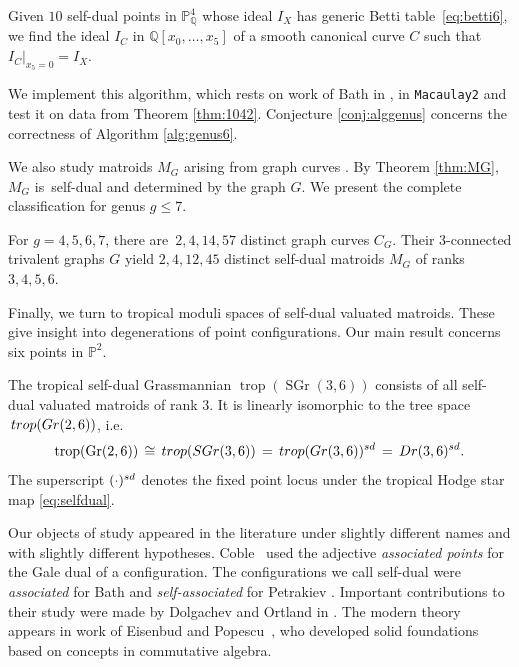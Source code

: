\documentclass[12pt]{extarticle}
\theoremstyle{definition}
\numberwithin{theorem}{section}
\theoremstyle{plain}\newtheorem{ithm}{Theorem}
\newcommand{\PP}{\mathbb{P}}
\newcommand{\QQ}{\mathbb{Q}}
\DeclareMathOperator{\trop}{trop}
\DeclareMathOperator{\SGr}{SGr}
\DeclareMathOperator{\Gr}{Gr}
\newenvironment{customthm}[1]
{\renewcommand\theinnercustomthm{#1}\innercustomthm}
{\endinnercustomthm}
\newenvironment{customalg}[1]
{\renewcommand\theinnercustomalg{#1}\innercustomalg}
{\endinnercustomalg}
\begin{document}
\begin{customalg}{\ref{alg:genus6}}
Given $10$ self-dual points in $\PP^4_\QQ$ whose ideal $I_X$ has 
generic 
Betti table~\eqref{eq:betti6},
we 
find the ideal $I_C$ in $\QQ[x_0,\ldots,x_5]$ of a 
smooth canonical curve $C$ such that $I_C|_{x_5 = 0}=I_X$. 
\end{customalg}

We implement this algorithm, which rests on work of Bath in \cite{Bath},
in  \texttt{Macaulay2} \cite{M2} and test it on data from Theorem \ref{thm:1042}.
Conjecture \ref{conj:alggenus} concerns the correctness of 
Algorithm \ref{alg:genus6}.

We also study matroids $M_G$ arising from graph curves  \cite{BE}.
By Theorem \ref{thm:MG}, $M_G$ is~self-dual and determined by the graph $G$.
We present the complete classification for genus $g \leq 7$.

\begin{customthm} {\ref{thm:graphcurves4567}}
  For $g=4,5,6,7$, there are  $\,2,4,14,57$ distinct graph curves $C_G$.
  Their $3$-connected trivalent graphs $G$ yield $2,4,12,45$ distinct self-dual matroids $M_G$ of
  ranks $3,4,5,6$.
\end{customthm}

Finally, we turn to tropical moduli spaces of  self-dual valuated matroids. These give insight into degenerations of point configurations. Our main result concerns six points in $\PP^2$.

  \begin{customthm}{\ref{thm:dreisechs}}
  The tropical self-dual Grassmannian $\trop(\SGr(3,6))$ consists of all self-dual valuated matroids 
  of rank $3$.
   It is linearly isomorphic to the tree space $\,{\rm trop}({\rm Gr}(2,6))$, i.e.
   \begin{equation*}
   \trop(\Gr(2,6))\,\cong\, {\rm trop}({\rm SGr}(3,6))\, = \, {\rm trop}({\rm Gr}(3,6))^{\rm sd}
        \,= \,
       {\rm Dr}(3,6)^{\rm sd}.
    \end{equation*}
The superscript $(\cdot)^{\rm sd}$ denotes the fixed point locus under the tropical Hodge star map \eqref{eq:selfdual}.%
  \end{customthm}

Our objects of study appeared in the literature under slightly different names and with slightly different hypotheses.
Coble~\cite{coble} used the adjective {\em associated points} for the Gale dual
of a configuration.  The configurations we call self-dual
were  {\em associated}  for Bath \cite{Bath} and 
  {\em self-associated} for Petrakiev \cite{Pet}.
 Important contributions to their study were made
by Dolgachev and Ortland in \cite[Chapter~III]{DO}.
The modern theory  appears in work 
of Eisenbud and Popescu~\cite{EP}, who developed 
 solid foundations based on concepts in commutative algebra.
\end{document}
